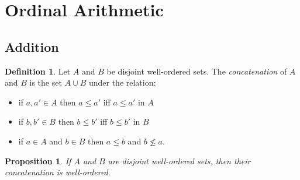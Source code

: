 \documentclass{book}
\newtheorem{prop}[ax]{Proposition}
\theoremstyle{definition}
\newtheorem{df}[ax]{Definition}
\begin{document}
\section{Ordinal Arithmetic}

\subsection{Addition}

\begin{df}
Let $A$ and $B$ be disjoint well-ordered sets. The \emph{concatenation} of $A$ and $B$ is the set $A \cup B$ under the relation:
\begin{itemize}
\item if $a,a' \in A$ then $a \leq a'$ iff $a \leq a'$ in $A$
\item if $b, b' \in B$ then $b \leq b'$ iff $b \leq b'$ in $B$
\item if $a \in A$ and $b \in B$ then $a \leq b$ and $b \not\leq a$.
\end{itemize}
\end{df}

\begin{prop}
If $A$ and $B$ are disjoint well-ordered sets, then their concatenation is well-ordered.
\end{prop}
\end{document}
